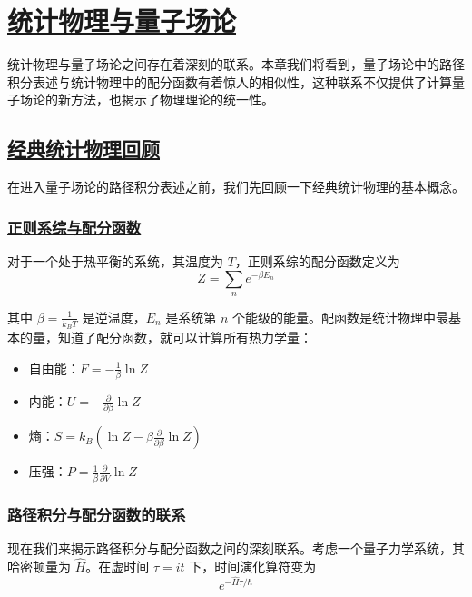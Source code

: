 \chapter{\protect\hyperlink{:}{统计物理与量子场论}}

统计物理与量子场论之间存在着深刻的联系。本章我们将看到，量子场论中的路径积分表述与统计物理中的配分函数有着惊人的相似性，这种联系不仅提供了计算量子场论的新方法，也揭示了物理理论的统一性。

\section{\protect\hyperlink{:}{经典统计物理回顾}}

在进入量子场论的路径积分表述之前，我们先回顾一下经典统计物理的基本概念。

\subsection{\protect\hyperlink{:}{正则系综与配分函数}}

对于一个处于热平衡的系统，其温度为 $T$，正则系综的配分函数定义为
\begin{equation}
    Z = \sum_n e^{-\beta E_n}
\end{equation}

其中 $\beta = \frac{1}{k_B T}$ 是逆温度，$E_n$ 是系统第 $n$ 个能级的能量。配函数是统计物理中最基本的量，知道了配分函数，就可以计算所有热力学量：

\begin{itemize}
    \item 自由能：$F = -\frac{1}{\beta}\ln Z$
    \item 内能：$U = -\frac{\partial}{\partial\beta}\ln Z$
    \item 熵：$S = k_B\left(\ln Z - \beta\frac{\partial}{\partial\beta}\ln Z\right)$
    \item 压强：$P = \frac{1}{\beta}\frac{\partial}{\partial V}\ln Z$
\end{itemize}

\subsection{\protect\hyperlink{:}{路径积分与配分函数的联系}}

现在我们来揭示路径积分与配分函数之间的深刻联系。考虑一个量子力学系统，其哈密顿量为 $\hat{H}$。在虚时间 $\tau = it$ 下，时间演化算符变为
\begin{equation}
    e^{-\hat{H}\tau/\hbar}
\end{equation}

